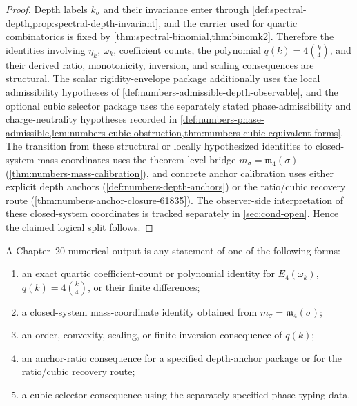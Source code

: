 \begin{proof}
Depth labels \(k_\sigma\) and their invariance enter through
\cref{def:spectral-depth,prop:spectral-depth-invariant}, and the
carrier used for quartic combinatorics is fixed by
\cref{thm:spectral-binomial,thm:binomk2}.
Therefore the identities involving \(\eta_k\), \(\omega_k\),
coefficient counts, the polynomial \(q(k)=4\binom{k}{4}\), and their
derived ratio, monotonicity, inversion, and scaling consequences are
structural.
The scalar rigidity-envelope package additionally uses the local
admissibility hypotheses of
\cref{def:numbers-admissible-depth-observable}, and the optional cubic
selector package uses the separately stated phase-admissibility and
charge-neutrality hypotheses recorded in
\cref{def:numbers-phase-admissible,lem:numbers-cubic-obstruction,thm:numbers-cubic-equivalent-forms}.
The transition from these structural or locally hypothesized identities
to closed-system mass coordinates uses the theorem-level bridge
\(m_\sigma=\mathfrak m_4(\sigma)\)
(\cref{thm:numbers-mass-calibration}), and concrete anchor
calibration uses either explicit depth anchors
(\cref{def:numbers-depth-anchors}) or the ratio/cubic recovery route
(\cref{thm:numbers-anchor-closure-61835}).
The observer-side interpretation of these closed-system coordinates is
tracked separately in \cref{sec:cond-open}.
Hence the claimed logical split follows.
\end{proof}

\begin{definition}
\label{def:numbers-output-types}
A Chapter~20 numerical output is any statement of one of the following
forms:
\begin{enumerate}[label=\textup{(O\arabic*)}]
\item an exact quartic coefficient-count or polynomial identity for
      \(E_4(\omega_k)\), \(q(k)=4\binom{k}{4}\), or their finite
      differences;
\item a closed-system mass-coordinate identity obtained from
      \(m_\sigma=\mathfrak m_4(\sigma)\);
\item an order, convexity, scaling, or finite-inversion consequence of
      \(q(k)\);
\item an anchor-ratio consequence for a specified depth-anchor package or
      for the ratio/cubic recovery route;
\item a cubic-selector consequence using the separately specified
      phase-typing data.
\end{enumerate}
\end{definition}

